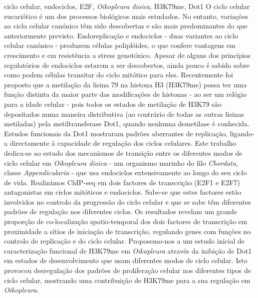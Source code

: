 \documentclass[11pt,twoside,a4paper]{report}
\begin{document}
\TitlePage
  \vspace*{55mm}
        {ciclo celular, endociclos, E2F, \textit{Oikopleura dioica}, H3K79me, Dot1}
    	{O ciclo celular eucariótico é um dos processos biológicos mais estudados. No entanto, variações ao ciclo celular canónico têm sido descobertas e são mais predominantes do que anteriormente previsto. Endoreplicação e endociclos - duas variantes ao ciclo celular canónico - produzem células poliplóides, o que confere vantagens em crescimento e em resistência a stress genotóxico. Apesar de alguns dos princípios regulatórios de endociclos estarem a ser descobertos, ainda pouco é sabido sobre como podem células transitar do ciclo mitótico para eles.
    	Recentemente foi proposto que a metilação da lisina 79 na histona H3 (H3K79me) possa ter uma função distinta da maior parte das modificações de histonas - ao ser um relógio para a idade celular - pois todos os estados de metilação de H3K79 são depositados numa maneira distributiva (ao contrário de todas as outras lisinas metiladas) pela metiltransferase Dot1, quando nenhuma demetilase é conhecida. Estudos funcionais da Dot1 mostraram padrões aberrantes de replicação, ligando-a directamente à capacidade de regulação dos ciclos celulares.
    	Este trabalho dedica-se ao estudo dos mecanismos de transição entre os diferentes modos de ciclo celular em \textit{Oikopleura dioica} - um organismo marinho do filo \textit{Chordata}, classe \textit{Appendicularia} - que usa endociclos extensivamente ao longo do seu ciclo de vida.
    	Realizámos ChIP-seq em dois factores de transcrição (E2F1 e E2F7) antagonistas em ciclos mitóticos e endociclos. Sabe-se que estes factores estão involvidos no controlo da progressão do ciclo celular e que se sabe têm diferentes padrões de regulação nos diferentes ciclos. Os resultados revelam um grande proporção de co-localização spatio-temporal dos dois factores de transcrição em proximidade a sítios de iniciação de transcrição, regulando genes com funções no controlo de replicação e do ciclo celular.
    	Proposemo-nos a um estudo inicial de caracterização funcional de H3K79me em \textit{Oikopleura} através da inibição de Dot1 em estados de desenvolvimento que usam diferentes modos de ciclo celular. Isto provocou desregulação dos padrões de proliferação celular nos diferentes tipos de ciclo celular, mostrando uma contribuição de H3K79me para a sua regulação em \textit{Oikopleura}.
		}
\EndTitlePage

\cleardoublepage
\end{document}
